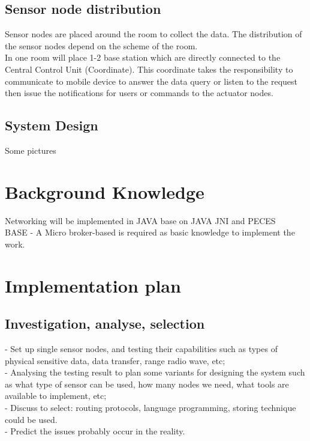 \documentclass[a4paper, 12pt]{article}
\begin{document}
\subsection{Sensor node distribution}
Sensor nodes are placed around the room to collect the data. The distribution of the sensor nodes depend on the scheme of the room. \\
In one room will place 1-2 base station which are directly connected to the Central Control Unit (Coordinate). This coordinate takes the responsibility to communicate to mobile device to answer the data query or listen to the request then issue the notifications for users or commands to the actuator nodes.
\subsection{System Design}
Some pictures
\section{Background Knowledge}
Networking will be implemented in JAVA base on JAVA JNI and PECES\\
BASE - A Micro broker-based is required as basic knowledge to implement the work.
\section{Implementation plan}

\subsection{Investigation, analyse, selection}
- Set up single sensor nodes, and testing their capabilities such as types of physical sensitive data, data transfer, range radio wave, etc;\\
- Analysing the testing result to plan some variants for designing the system such as  what type of sensor can be used, how many nodes we need, what tools are available to implement, etc;\\
- Discuss to select: routing protocols, language programming, storing technique could be used.\\
- Predict the issues probably occur in the reality.
\end{document}
